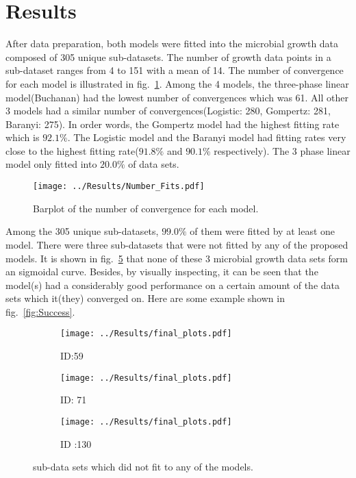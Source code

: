 
\section{Results}
After data preparation, both models were fitted into the microbial growth data composed of 305 unique sub-datasets. The number of growth data points in a sub-dataset ranges from 4 to 151 with a mean of 14. The number of convergence for each model is illustrated in fig.~\ref{fig:NumbersOfFits}. Among the 4 models, the three-phase linear model(Buchanan) had the lowest number of convergences which was 61. All other 3 models had a similar number of convergences(Logistic: 280, Gompertz: 281, Baranyi: 275). In order words, the Gompertz model had the highest fitting rate which is $92.1\%$. The Logistic model and the Baranyi model had fitting rates very close to the highest fitting rate($91.8\%$ and $90.1\%$ respectively). The 3 phase linear model only fitted into $20.0\%$ of data sets.

\begin{figure}[H] %
  \centering
  \texttt{[image: ../Results/Number\_Fits.pdf]}
  \caption{Barplot of the number of convergence for each model.}
  \label{fig:NumbersOfFits} 
\end{figure}

Among the 305 unique sub-datasets, $99.0\%$ of them were fitted by at least one model. There were three sub-datasets that were not fitted by any of the proposed models. It is shown in fig.~\ref{fig:Failures} that none of these 3  microbial growth data sets form an sigmoidal curve. Besides, by visually inspecting, it can be seen that the model(s) had a considerably good performance on a certain amount of the data sets which it(they) converged on. Here are some example shown in fig.~\ref{fig:Success}.

\begin{figure}[H] %
  \centering
    \begin{subfigure}[h]{0.4\textwidth}
        \texttt{[image: ../Results/final\_plots.pdf]}
        \caption{ID:59}
        \label{fig:59}
    \end{subfigure}
    \hfill
    \begin{subfigure}[h]{0.4\textwidth}
        \texttt{[image: ../Results/final\_plots.pdf]}
        \caption{ID: 71}
        \label{fig:71}
    \end{subfigure}
    \hfill
    \begin{subfigure}[h]{0.4\textwidth}
    \texttt{[image: ../Results/final\_plots.pdf]}
    \caption{ID :130}
    \label{fig:130}
    \end{subfigure}
  \caption{sub-data sets which did not fit to any of the models.}
  \label{fig:Failures} 
\end{figure}

